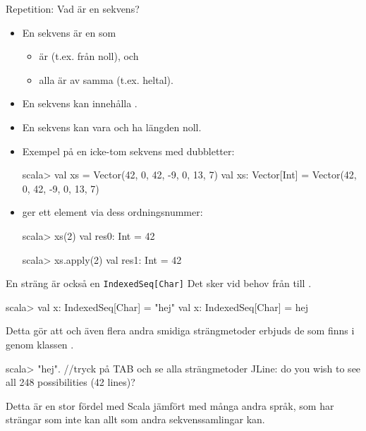 \begin{Slide}{Repetition: Vad är en sekvens?}
\begin{itemize}
\item En sekvens är en  som
  \begin{itemize}
   \item är  (t.ex. från noll), och
   \item alla är av samma  (t.ex. heltal).
  \end{itemize}
  \pause
\item En sekvens kan innehålla .
\item En sekvens kan vara  och ha längden noll.
\item Exempel på en icke-tom sekvens med dubbletter:
\begin{REPLnonum}
scala> val xs = Vector(42, 0, 42, -9, 0, 13, 7)
val xs: Vector[Int] = Vector(42, 0, 42, -9, 0, 13, 7)
\end{REPLnonum}
\pause
\item {} ger ett element via dess ordningsnummer:
\begin{REPL}
scala> xs(2)
val res0: Int = 42

scala> xs.apply(2)
val res1: Int = 42
\end{REPL}
\end{itemize}
\end{Slide}


\begin{Slide}{En sträng är också en \texttt{IndexedSeq[Char]}}\SlideFontSmall
Det sker vid behov  från  till .
\begin{REPLnonum}
scala> val x: IndexedSeq[Char] = "hej"
val x: IndexedSeq[Char] = hej
\end{REPLnonum}

Detta gör att  och även flera andra smidiga strängmetoder erbjuds  de som finns i \href{https://www.scala-lang.org/api/current/scala/collection/StringOps.html}{} genom klassen \href{http://www.scala-lang.org/api/current/scala/collection/immutable/StringOps.html}{}.

\vspace{0.5em}
\begin{REPLnonum}
scala> "hej".  //tryck på TAB och se alla strängmetoder
JLine: do you wish to see all 248 possibilities (42 lines)?
\end{REPLnonum}
Detta är en stor fördel med Scala jämfört med många andra språk, som har strängar som inte kan allt som andra sekvenssamlingar kan.
\end{Slide}
  

